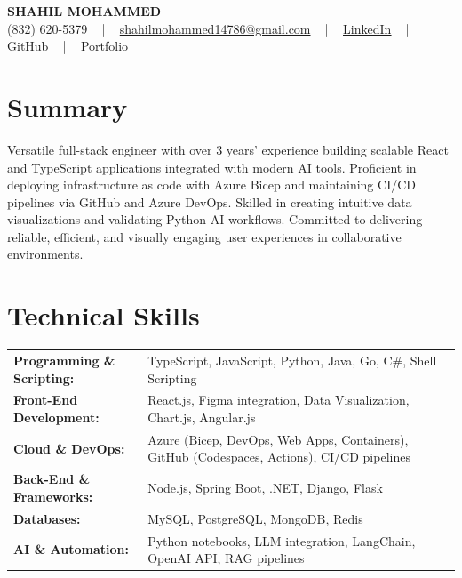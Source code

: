 \documentclass[letterpaper,11pt]{article}
\begin{document}
\begin{center}
    {\fontsize{14pt}{12pt}\selectfont \textbf{\MakeUppercase{Shahil Mohammed}}}\\ \vspace{2pt}
    \fontsize{10pt}{12pt}\selectfont (832) 620-5379 ~ | ~ \href{mailto:shahilmohammed14786@gmail.com}{shahilmohammed14786@gmail.com} ~ | ~  
    \href{https://www.linkedin.com/in/shahil-mohammed-9652931a1/}{\color{blue}\underline{LinkedIn}}  ~ | ~ 
    \href{https://github.com/freakbeast14}{\color{blue}\underline{GitHub}} ~ | ~ 
    \href{https://shahil-mohammed.netlify.app/}{\color{blue}\underline{Portfolio}}
    \vspace{-8pt}
\end{center}

\section{Summary}
\fontsize{9pt}{10pt}\selectfont
Versatile full-stack engineer with over 3 years’ experience building scalable React and TypeScript applications integrated with modern AI tools. Proficient in deploying infrastructure as code with Azure Bicep and maintaining CI/CD pipelines via GitHub and Azure DevOps. Skilled in creating intuitive data visualizations and validating Python AI workflows. Committed to delivering reliable, efficient, and visually engaging user experiences in collaborative environments.
 \vspace{-5pt}
 
\section{Technical Skills}
        \vspace{-14pt}
        \begin{table}[h]
            \fontsize{9pt}{10pt}\selectfont
            \begin{tabular}{p{0.3\linewidth} p{0.7\linewidth}}
                \textbf{Programming \& Scripting:} & TypeScript, JavaScript, Python, Java, Go, C\#, Shell Scripting \\
                \textbf{Front-End Development:} & React.js, Figma integration, Data Visualization, Chart.js, Angular.js \\
                \textbf{Cloud \& DevOps:} & Azure (Bicep, DevOps, Web Apps, Containers), GitHub (Codespaces, Actions), CI/CD pipelines \\
                \textbf{Back-End \& Frameworks:} & Node.js, Spring Boot, .NET, Django, Flask \\
                \textbf{Databases:} & MySQL, PostgreSQL, MongoDB, Redis \\
                \textbf{AI \& Automation:} & Python notebooks, LLM integration, LangChain, OpenAI API, RAG pipelines \\
            \end{tabular}
        \end{table}
 \vspace{-15pt}
 
\end{document}

